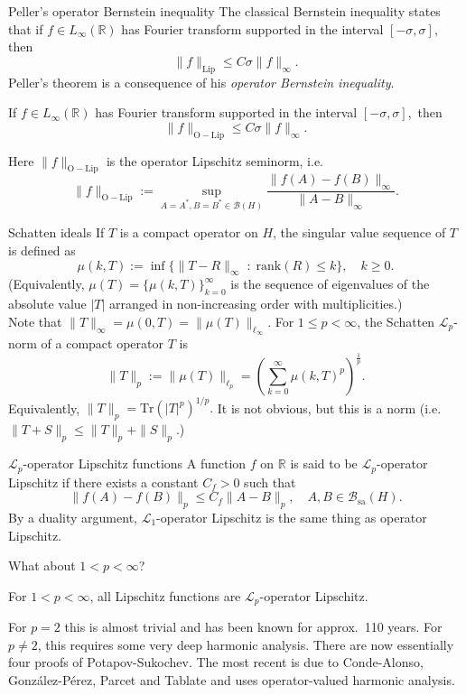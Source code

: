 \documentclass{beamer}
\numberwithin{equation}{section}
\theoremstyle{plain}
\theoremstyle{plain}
\theoremstyle{definition}
\theoremstyle{plain}
\theoremstyle{plain}
\theoremstyle{definition}
\newcommand{\Rl}{\mathbb{R}}
\newcommand{\Bc}{\mathcal{B}}
\newcommand{\Lc}{\mathcal{L}}
\newcommand{\Tr}{\mathrm{Tr}}
\newcommand{\sa}{\mathrm{sa}}
\begin{document}
\begin{frame}{Peller's operator Bernstein inequality}
    The classical Bernstein inequality states that if $f \in L_{\infty}(\Rl)$ has Fourier transform supported in the interval $[-\sigma,\sigma],$ then
    \[
        \|f\|_{\mathrm{Lip}} \leq C\sigma \|f\|_{\infty}.
    \]\pause
    Peller's theorem is a consequence of his \emph{operator Bernstein inequality}.
    \begin{theorem}[Peller (1990)]
        If $f \in L_{\infty}(\Rl)$ has Fourier transform supported in the interval $[-\sigma,\sigma],$ then
        \[
            \|f\|_{\mathrm{O-Lip}} \leq C\sigma\|f\|_\infty.
        \]
    \end{theorem}
    Here $\|f\|_{\mathrm{O-Lip}}$ is the operator Lipschitz seminorm, i.e.
    \[
        \|f\|_{\mathrm{O-Lip}} := \sup_{A=A^*,B=B^*\in \Bc(H)} \frac{\|f(A)-f(B)\|_{\infty}}{\|A-B\|_{\infty}}.
    \]
\end{frame}

\begin{frame}{Schatten ideals}
    If $T$ is a compact operator on $H$, the singular value sequence of $T$ is defined as
    $$
        \mu(k,T) := \inf\{\|T-R\|_{\infty}\;:\;\mathrm{rank}(R)\leq k\},\quad k\geq 0.
    $$
    (Equivalently, $\mu(T) = \{\mu(k,T)\}_{k=0}^\infty$ is the sequence of eigenvalues of the absolute value $|T|$ arranged in non-increasing order with multiplicities.)\\
    \pause
    Note that $\|T\|_\infty = \mu(0,T) = \|\mu(T)\|_{\ell_\infty}.$
    \pause
    For $1\leq p < \infty$, the Schatten $\Lc_p$-norm of a compact operator $T$ is
    $$
        \|T\|_p := \|\mu(T)\|_{\ell_p} = \left(\sum_{k=0}^\infty \mu(k,T)^p\right)^{\frac1p}.
    $$
    Equivalently, $\|T\|_p = \Tr(|T|^p)^{1/p}.$
    It is not obvious, but this is a norm (i.e. $\|T+S\|_p\leq \|T\|_p+\|S\|_p.$)
\end{frame}

\begin{frame}{$\Lc_p$-operator Lipschitz functions}
    A function $f$ on $\Rl$ is said to be $\Lc_p$-operator Lipschitz if there exists a constant $C_f>0$ such that
    $$
        \|f(A)-f(B)\|_p \leq C_f\|A-B\|_p,\quad A,B \in \Bc_{\sa}(H).
    $$
    By a duality argument, $\Lc_1$-operator Lipschitz is the same thing as operator Lipschitz.\pause
    
    What about $1 < p < \infty$?\pause
    \begin{theorem}
        For $1 < p < \infty$, all Lipschitz functions are $\Lc_p$-operator Lipschitz.
    \end{theorem}   
    \pause
    For $p=2$ this is almost trivial and has been known for approx.~110 years. For $p\neq 2$, this requires some very deep
    harmonic analysis. \pause
    There are now essentially four proofs of Potapov-Sukochev. The most recent is due to
    Conde-Alonso, Gonz\'alez-P\'erez, Parcet and Tablate and uses operator-valued harmonic analysis.
\end{frame}
\end{document}
